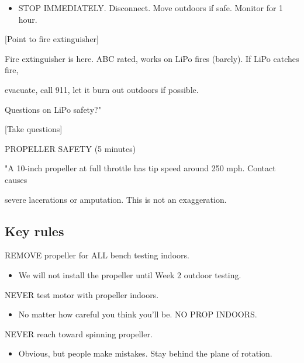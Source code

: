\documentclass[11pt,letterpaper]{article}
\begin{document}
{\begin{itemize}
  \item STOP IMMEDIATELY. Disconnect. Move outdoors if safe. Monitor for 1 hour.
\end{itemize}

[Point to fire extinguisher]\par

Fire extinguisher is here. ABC rated, works on LiPo fires (barely). If LiPo catches fire,\par

evacuate, call 911, let it burn out outdoors if possible.\par

Questions on LiPo safety?"\par

[Take questions]\par

PROPELLER SAFETY (5 minutes)\par

"A 10-inch propeller at full throttle has tip speed around 250 mph. Contact causes\par

severe lacerations or amputation. This is not an exaggeration.\par

\subsection{Key rules}

REMOVE propeller for ALL bench testing indoors.\par

\begin{itemize}
  \item We will not install the propeller until Week 2 outdoor testing.
\end{itemize}

NEVER test motor with propeller indoors.\par

\begin{itemize}
  \item No matter how careful you think you'll be. NO PROP INDOORS.
\end{itemize}

NEVER reach toward spinning propeller.\par

\begin{itemize}
  \item Obvious, but people make mistakes. Stay behind the plane of rotation.
\end{itemize}

}
\end{document}
